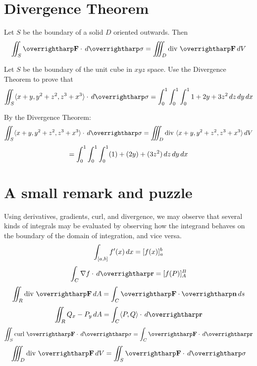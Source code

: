 \documentclass[letterpaper, twoside, 12pt]{book}
\begin{document}
\section{Divergence Theorem}%

\begin{theorem}
  Let $S$ be the boundary of a solid $D$ oriented outwards.
  Then
  \[
    \iint_S \vect{F}\cdot\dvar{\vect\sigma}
      =
    \iiint_D \text{div }\vect{F}\dvar{V}
  \]
\end{theorem}

          \begin{problem}
            Let $S$ be the boundary of the unit cube in $xyz$ space.
            Use the Divergence Theorem to prove that
            \[
              \iint_S \<x+y,y^2+z^2,z^3+x^3\>\cdot\dvar{\vect\sigma}
                =
              \int_0^1\int_0^1\int_0^1 1+2y+3z^2 \dvar{z}\dvar{y}\dvar{x}
            \]
          \end{problem}

          \begin{solution}
            By the Divergence Theorem:
            \[
              \iint_S \<x+y,y^2+z^2,z^3+x^3\>\cdot\dvar{\vect\sigma}
                =
              \iiint_D \text{div }\<x+y,y^2+z^2,z^3+x^3\>\dvar{V}
            \]
            \[
                =
              \int_0^1\int_0^1\int_0^1 (1)+(2y)+(3z^2)\,d{z}\,d{y}\,d{x}
            \]
          \end{solution}

\section{A small remark and puzzle}

\begin{remark}
  Using derivatives, gradients, curl, and divergence, we may observe that
  several kinds of integrals may be evaluated by observing how the
  integrand behaves on the boundary of the domain of integration, and
  vice versa.
  \[
    \int_{[a,b]} f'(x)\,d{x} = [f(x)]_a^b
  \]
  \[
    \int_C \nabla f\cdot \dvar{\vect r} = [f(P)]_A^B
  \]
  \[
    \iint_R \text{div }\vect{F} \dvar{A}
      =
    \int_C \vect{F}\cdot\vect{n}\dvar{s}
  \]
  \[
    \iint_R Q_x-P_y \dvar{A}
      =
    \int_C \<P,Q\>\cdot\dvar{\vect r}
  \]
  \[
    \iint_S \text{curl }\vect{F}\cdot\dvar{\vect\sigma}
      =
    \int_C \vect{F}\cdot\dvar{\vect{r}}
  \]
  \[
    \iiint_D \text{div }\vect{F}\dvar{V}
      =
    \iint_S \vect{F}\cdot\dvar{\vect\sigma}
  \]
\end{remark}
\end{document}
